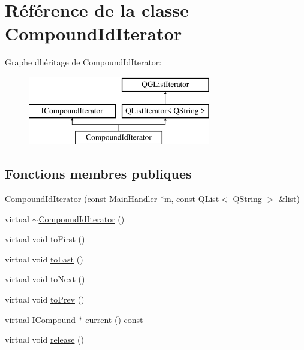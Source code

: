 \hypertarget{class_compound_id_iterator}{}\section{Référence de la classe Compound\+Id\+Iterator}
\label{class_compound_id_iterator}
Graphe d\textquotesingle{}héritage de Compound\+Id\+Iterator\+:\begin{figure}[H]
\begin{center}
\leavevmode
\includegraphics[height=3.000000cm]{class_compound_id_iterator}
\end{center}
\end{figure}
\subsection*{Fonctions membres publiques}
\begin{DoxyCompactItemize}
\item 
\hyperlink{class_compound_id_iterator_aa1152215516fdf215ede1b19204d17ba}{Compound\+Id\+Iterator} (const \hyperlink{class_main_handler}{Main\+Handler} $\ast$\hyperlink{060__command__switch_8tcl_a78d127e8bda64d4471ac811ad512fbd9}{m}, const \hyperlink{class_q_list}{Q\+List}$<$ \hyperlink{class_q_string}{Q\+String} $>$ \&\hyperlink{class_q_g_list_iterator_a6e606950ab50b273e8370d9e24756bf2}{list})
\item 
virtual \hyperlink{class_compound_id_iterator_a3d6aca723d03efa8db1387a46719cf23}{$\sim$\+Compound\+Id\+Iterator} ()
\item 
virtual void \hyperlink{class_compound_id_iterator_aa5a023c4b2b80ea1482471670906e6f2}{to\+First} ()
\item 
virtual void \hyperlink{class_compound_id_iterator_ac0b023226257444051756a2a5f78e42c}{to\+Last} ()
\item 
virtual void \hyperlink{class_compound_id_iterator_a1707e98108f1acadd96bdfcc16311779}{to\+Next} ()
\item 
virtual void \hyperlink{class_compound_id_iterator_affc7e21f97fa4015d967a3db7bc43793}{to\+Prev} ()
\item 
virtual \hyperlink{class_i_compound}{I\+Compound} $\ast$ \hyperlink{class_compound_id_iterator_a3f51f2154234a36a591a1917272f6407}{current} () const 
\item 
virtual void \hyperlink{class_compound_id_iterator_a19bee3dbe9c27b62cadeffa7448c1f15}{release} ()
\end{DoxyCompactItemize}
